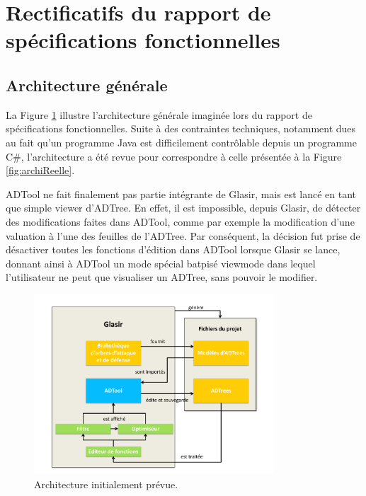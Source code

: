 \section{Rectificatifs du rapport de spécifications fonctionnelles}
\label{sec:rect}

\subsection{Architecture générale}
La {\sc Figure} \ref{fig:archiPrevue} illustre l'architecture générale imaginée lors du rapport de spécifications fonctionnelles. Suite à des contraintes techniques, notamment dues au fait qu'un programme Java est difficilement contrôlable depuis un programme C\#, l'architecture a été revue pour correspondre à celle présentée à la {\sc Figure} \ref{fig:archiReelle}. 

ADTool ne fait finalement pas partie intégrante de Glasir, mais est lancé en tant que simple \og viewer \fg{} d'ADTree. En effet, il est impossible, depuis Glasir, de détecter des modifications faites dans ADTool, comme par exemple la modification d'une valuation à l'une des feuilles de l'ADTree. Par conséquent, la décision fut prise de désactiver toutes les fonctions d'édition dans ADTool lorsque Glasir se lance, donnant ainsi à ADTool un mode spécial batpisé \og viewmode \fg{} dans lequel l'utilisateur ne peut que visualiser un ADTree, sans pouvoir le modifier.

		\begin{figure}[H]
            \centering
                \includegraphics[width=0.8\textwidth]{figure/archiGlasir.pdf}
            \caption{Architecture initialement prévue.}
            \label{fig:archiPrevue}
        \end{figure}
	
